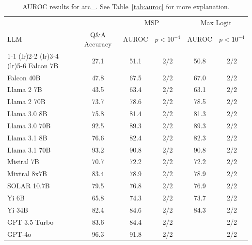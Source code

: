 \begin{table}[h]
\caption{AUROC results for arc_. See Table~\ref{tab:auroc} for more explanation.}
\label{tab:auroc_margin}
\centering
\begin{tabular}{lccccc}
\toprule
& & \multicolumn{2}{c}{MSP} & \multicolumn{2}{c}{Max Logit} \\ 
LLM & Q\&A Accuracy & AUROC & $p < 10^{-4}$ & AUROC & $p < 10^{-4}$ \\ 
\cmidrule(lr){1-1} \cmidrule(lr){2-2} \cmidrule(lr){3-4} \cmidrule(lr){5-6} 
Falcon 7B & 27.1 & 51.1 & 2/2 & 50.8 & 2/2\\
Falcon 40B & 47.8 & 67.5 & 2/2 & 67.0 & 2/2\\
Llama 2 7B & 43.5 & 63.4 & 2/2 & 63.1 & 2/2\\
Llama 2 70B & 73.7 & 78.6 & 2/2 & 78.5 & 2/2\\
Llama 3.0 8B & 75.8 & 81.4 & 2/2 & 81.3 & 2/2\\
Llama 3.0 70B & 92.5 & 89.3 & 2/2 & 89.3 & 2/2\\
Llama 3.1 8B & 76.6 & 82.4 & 2/2 & 82.3 & 2/2\\
Llama 3.1 70B & 93.2 & 90.8 & 2/2 & 90.8 & 2/2\\
Mistral 7B & 70.7 & 72.2 & 2/2 & 72.2 & 2/2\\
Mixtral 8x7B & 83.4 & 78.9 & 2/2 & 78.9 & 2/2\\
SOLAR 10.7B & 79.5 & 76.8 & 2/2 & 76.9 & 2/2\\
Yi 6B & 65.8 & 74.3 & 2/2 & 73.7 & 2/2\\
Yi 34B & 82.4 & 84.6 & 2/2 & 84.3 & 2/2\\
GPT-3.5 Turbo & 83.6 & 84.4 & 2/2 &  & 2/2\\
GPT-4o & 96.3 & 91.8 & 2/2 &  & 2/2\\
\bottomrule
\end{tabular}
\end{table}
